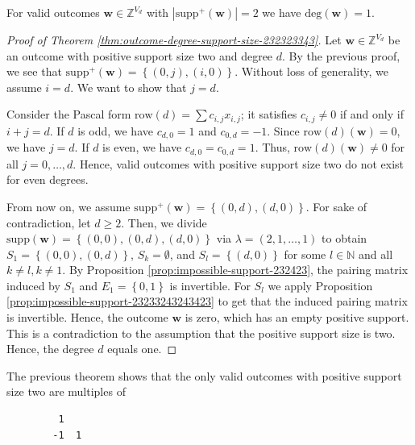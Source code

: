 \begin{theorem}\label{thm:outcome-degree-support-size-232323343}
    For valid outcomes \( \mathbf w \in \mathbb{Z}^{V_d} \) with \( |\mathrm{supp}^+(\mathbf w)| = 2 \) we have \( \mathrm{deg}(\mathbf w) = 1 \).
\end{theorem}


\begin{proof}[Proof of Theorem \ref{thm:outcome-degree-support-size-232323343}]
    Let \( \mathbf{w} \in \mathbb{Z}^{V_d} \) be an outcome with positive support size two and degree \( d \).
    By the previous proof, we see that \( \mathrm{supp}^+({\mathbf{w}}) = \left\{  (0,j), (i,0) \right\} \). Without loss of generality, we assume \( i = d \). We want to show that \( j = d \). 
    
    Consider the Pascal form \( \mathrm{row}(d) = \sum c_{i,j} x_{i,j} \); it satisfies \( c_{i,j} \neq 0 \) if and only if \( i + j = d \). If \( d \) is odd, we have \( c_{d,0} = 1 \) and \( c_{0,d} = -1 \). Since \( \mathrm{row}(d)(\mathbf{w}) = 0 \), we have \( j = d \). If \( d \) is even, we have \( c_{d,0} = c_{0,d} = 1 \). Thus, \( \mathrm{row}(d)(\mathbf w) \neq 0 \) for all \( j = 0, \dots, d \). Hence, valid outcomes with positive support size two do not exist for even degrees.

    From now on, we assume \(         \mathrm{supp}^+({\mathbf{w}}) = \left\{  (0,d), (d,0) \right\}    \).
    For sake of contradiction, let \( d \geq 2 \). Then, we divide \( \mathrm{supp}({\mathbf{w}}) = \left\{  (0,0) , (0,d), (d,0) \right\} \)
    via \( \lambda = (2,1,\dots,1) \) to obtain \( S_1 = \left\{ (0,0), (0,d) \right\} \), \( S_k = \emptyset \), and \( S_l = \left\{ (d,0) \right\} \) for some \( l \in \mathbb{N} \) and all \( k \neq l, k \neq 1 \). By Proposition \ref{prop:impossible-support-232423}, the pairing matrix induced by \( S_1 \) and \( E_1 = \left\{ 0,1 \right\} \) is invertible. For \( S_l \) we apply Proposition \ref{prop:impossible-support-23233243243423} to get that the induced pairing matrix is invertible. Hence, the outcome \( \mathbf{w} \) is zero, which has an empty positive support. This is a contradiction to the assumption that the positive support size is two. Hence, the degree \( d \) equals one.
\end{proof}

\begin{example}
    The previous theorem shows that the only valid outcomes with positive support size two are multiples of
    \begin{verbatim}
         1
        -1  1
    \end{verbatim}
\end{example}

